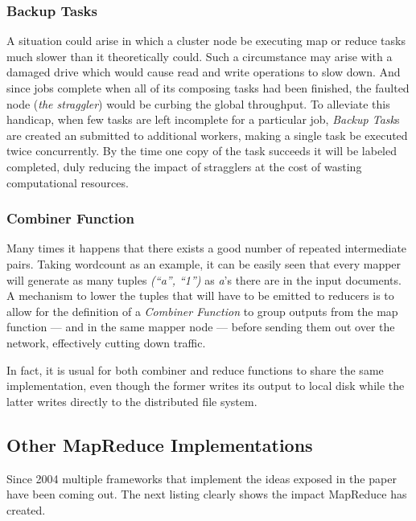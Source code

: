 \subsubsection{Backup Tasks}\label{subsubsec:secundarias}

\noindent A situation could arise in which a cluster node be executing map or reduce tasks much slower than it theoretically could. Such a circumstance may arise with a damaged drive which would cause read and write operations to slow down. And since jobs complete when all of its composing tasks had been finished, the faulted node (\emph{the straggler}) would be curbing the global throughput. To alleviate this handicap, when few tasks are left incomplete for a particular job, \emph{Backup Task}s are created an submitted to additional workers, making a single task be executed twice concurrently. By the time one copy of the task succeeds it will be labeled completed, duly reducing the impact of stragglers at the cost of wasting computational resources.

\subsubsection{Combiner Function}\label{subsubsec:combiner}

\noindent Many times it happens that there exists a good number of repeated intermediate pairs. Taking wordcount as an example, it can be easily seen that every mapper will generate as many tuples \emph{(``a'', ``1'')} as \emph{a}'s there are in the input documents. A mechanism to lower the tuples that will have to be emitted to reducers is to allow for the definition of a \emph{Combiner Function} to group outputs from the map function --- and in the same mapper node --- before sending them out over the network, effectively cutting down traffic.

In fact, it is usual for both combiner and reduce functions to share the same implementation, even though the former writes its output to local disk while the latter writes directly to the distributed file system.

\subsection{Other MapReduce Implementations}\label{subsec:frameworksmapred}

\noindent Since 2004 multiple frameworks that implement the ideas exposed in the paper \cite{googlemapreduce} have been coming out. The next listing clearly shows the impact MapReduce has created.

